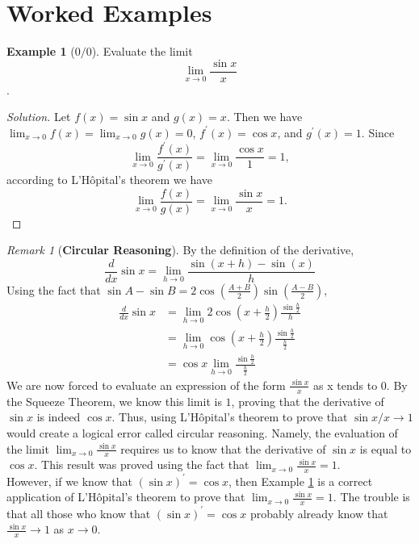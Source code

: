 \documentclass[a4paper]{amsproc}
\theoremstyle{plain}
\numberwithin{equation}{section} %
\numberwithin{figure}{section} %
\theoremstyle{plain}
\theoremstyle{definition}
\newtheorem{example}[thm]{Example}
\theoremstyle{definition}
\theoremstyle{remark}
\newtheorem{rem}[thm]{Remark}
\begin{document}
\section{Worked Examples}

\begin{example}[$0/0$]\label{exm:1}
Evaluate the limit \[\lim_{x\to 0}\frac{\sin x}{x} \].
\end{example}

\begin{proof}[Solution]
Let \( f(x)=\sin x \) and \( g(x)=x \). Then we have \( \lim_{x\to 0}f(x)=\lim_{x\to 0}g(x)=0 \), \( f^{\prime}(x)=\cos x \), and \( g^{\prime}(x)=1 \). Since \[ \lim_{x\to 0}\frac{f^{\prime}(x)}{g^{\prime}(x)}=\lim_{x\to 0}\frac{\cos x}{1}=1, \] according to L'H\^{o}pital's theorem we have \[ \lim_{x\to 0}\frac{f(x)}{g(x)}=\lim_{x\to 0}\frac{\sin x}{x}=1.\]
\end{proof}

\begin{rem}[\textbf{Circular Reasoning}]\color{red}
By the definition of the derivative,
\[\frac{d}{dx}\sin x = \lim_{h\to0}\frac{\sin(x+h)-\sin(x)}{h}\]
Using the fact that $\sin A- \sin B = 2\cos(\frac{A+B}{2})\sin(\frac{A-B}{2}),$
\begin{align*}
\frac{d}{dx} \sin x &= \lim_{h\to0}2\cos(x+\frac{h}{2}) \frac{\sin\frac{h}{2}}{h}\\
                    &= \lim_{h\to0} \cos(x+\frac{h}{2}) \frac{\sin\frac{h}{2}}{\frac{h}{2}}\\
                    &=\cos x\lim_{h\to0}\frac{\sin\frac{h}{2}}{\frac{h}{2}}
\end{align*}
We are now forced to evaluate an expression of the form $\frac{\sin x}{x}$ as x tends to 0. By the Squeeze Theorem, we know this limit is $1$, proving that the derivative of $\sin x$ is indeed $\cos x$. Thus, using L'H\^{o}pital's theorem to prove that \( \sin x/x\to 1 \) would create a logical error called circular reasoning. Namely, the evaluation of the limit \( \lim_{x\to0}\frac{\sin x}x \) requires us to know that the derivative of \( \sin x \) is equal to \( \cos x \). This result was proved using the fact that \( \lim_{x\to 0}\frac{\sin x}x=1 \).\\ However, if we know that \( (\sin x)^{\prime}=\cos x \), then Example \ref{exm:1} is a correct application of L'H\^{o}pital's theorem to prove that \(  \lim_{x\to 0}\frac{\sin x}x=1 \). The trouble is that all those who know that \( (\sin x)^{\prime}=\cos x \) probably already know that \( \frac{\sin x}x\to 1 \) as \( x\to 0 \).
\end{rem}
\end{document}

